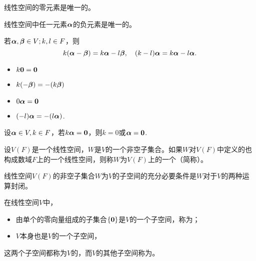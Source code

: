 \begin{frame}

  \begin{xingzhi}
    线性空间的零元素是唯一的。
  \end{xingzhi}  

  \begin{xingzhi}
    线性空间中任一元素$\boldsymbol{\alpha}$的负元素是唯一的。
  \end{xingzhi}  

  \begin{xingzhi}
    若$\boldsymbol{\alpha}, \boldsymbol{\beta} \in V; k, l \in F$，则
    $$
    k(\boldsymbol{\alpha} - \boldsymbol{\beta}) = k \boldsymbol{\alpha} - l \boldsymbol{\beta}, \quad
    (k-l)\boldsymbol{\alpha} = k\boldsymbol{\alpha} - l \boldsymbol{\alpha}.
    $$
  \end{xingzhi} 

  \begin{xingzhi}
    \begin{itemize}
    \item $k\M0 = \M0$
    \item $k(-\boldsymbol{\beta}) = -(k\boldsymbol{\beta})$
    \item $0\alphabd = \M0$
    \item $(-l)\boldsymbol{\alpha} = -(l\boldsymbol{\alpha})$.
    \end{itemize}
  \end{xingzhi} 

  \begin{xingzhi}
    设$\boldsymbol{\alpha} \in V, k\in F$，若$k\alphabd=\M0$，则$k=0$或$\alphabd=\M0$.
  \end{xingzhi}
\end{frame}

\begin{frame}
  \begin{dingyi}[线性子空间]
    设$V(F)$是一个线性空间，$W$是$V$的一个非空子集合。如果$W$对$V(F)$中定义的也构成数域$F$上的一个线性空间，则称$W$为$V(F)$上的一个（简称）。
  \end{dingyi}  \vspace{.2in}

  \begin{dingli}
    线性空间$V(F)$的非空子集合$W$为$V$的子空间的充分必要条件是$W$对于$V$的两种运算封闭。
  \end{dingli}
\end{frame}

\begin{frame}
  \begin{li}
    在线性空间$V$中，
    \begin{itemize}
    \item 由单个的零向量组成的子集合$\{\M0\}$是$V$的一个子空间，称为；
    \item $V$本身也是$V$的一个子空间，
    \end{itemize}
    这两个子空间都称为$V$的，而$V$的其他子空间称为。
  \end{li}
\end{frame}

